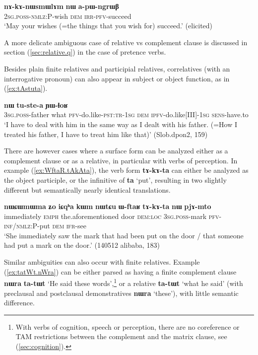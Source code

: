 \documentclass[oneside,a4paper,11pt]{article}
\newcommand{\ipa}[1]{\textbf{\phon#1}} %
\newcommand{\jpg}[2]{\ipa{#1} `#2'} %
\begin{document}
\begin{exe}
\ex \label{ex:nAkAnWsmWlAm}
\gll   \ipa{nɤ-kɤ-nɯsmɯlɤm} 	\ipa{nɯ} 	\ipa{a-pɯ-ngrɯβ} \\
\textsc{2sg.poss-nmlz:P}-wish \textsc{dem} \textsc{irr-pfv}-succeed \\
\glt `May your wishes (=the things that you wish for) succeed.' (elicited)
\end{exe}  

A more delicate ambiguous case of relative vs complement clause is discussed in section (\ref{sec:relative.q}) in the case of pretence verbs.

Besides plain finite relatives and participial relatives, correlatives (with an interrogative pronoun) can also appear in subject or object function, as in (\ref{ex:tAstuta}). 

\begin{exe}
\ex \label{ex:tAstuta}
\gll 
[\ipa{ɯ-wa} 	\ipa{tɕʰi} 	\ipa{tɤ-stu-t-a}] 	\ipa{nɯ} 	\ipa{tu-ste-a} 	\ipa{ɲɯ-ɬoʁ} \\
\textsc{3sg.poss-}father what \textsc{pfv}-do.like-\textsc{pst:tr}-\textsc{1sg} \textsc{dem} \textsc{ipfv}-do.like[III]-\textsc{1sg} \textsc{sens}-have.to \\
\glt `I have to deal with him in the same way as I dealt with his father. (=How I treated his father, I have to treat him like that)' (Slob.dpon2, 159)
\end{exe}

There are however cases where a surface form can be analyzed either as a complement clause or as a relative, in particular with verbs of perception. In example (\ref{ex:WftaR.tAkAta}), the verb form \ipa{tɤ-kɤ-ta} can either be analyzed as the object participle, or the infinitive of \jpg{ta}{put}, resulting in two slightly different but semantically nearly identical translations.

\begin{exe}
\ex  \label{ex:WftaR.tAkAta}
\gll 
\ipa{nɯɕɯmɯma} 	\ipa{ʑo} 	\ipa{iɕqʰa} 	\ipa{kɯm} 	\ipa{nɯtɕu} 	\ipa{ɯ-ftaʁ} 	\ipa{tɤ-kɤ-ta} 	\ipa{nɯ} 	\ipa{pjɤ-mto} \\
immediately \textsc{emph} the.aforementioned door \textsc{dem:loc} \textsc{3sg.poss}-mark \textsc{pfv-inf/nmlz:P}-put \textsc{dem} \textsc{ifr}-see \\
\glt `She immediately saw the mark that had been put on the door / that someone had put a mark on the door.' (140512 alibaba, 183)
\end{exe}

Similar ambiguities can also occur with finite relatives. Example (\ref{ex:tatWt.nWra}) can be either parsed as having a finite complement clause \ipa{nɯra} 	\ipa{ta-tɯt} `He said these words',\footnote{With verbs of cognition, speech or perception, there are no coreference or TAM restrictions between the complement and the matrix clause, see (\ref{sec:cognition}).} or a relative \ipa{ta-tɯt} `what he said' (with preclausal and postclausal demonstratives \ipa{nɯra} `these'), with little semantic difference.
\end{document}
